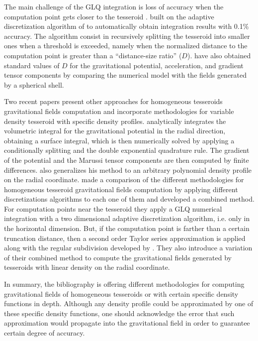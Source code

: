 \documentclass[extra, referee]{gji}
\begin{document}
The main challenge of the GLQ integration is loss of accuracy when the computation point
gets closer to the tesseroid \citep{Ku1977}.
\citet{Uieda2016} built on the adaptive discretization algorithm of \citet{Li2011}
to automatically obtain integration results with 0.1\% accuracy.
The algorithm consist in recursively splitting the tesseroid into smaller ones when a
threshold is exceeded,
namely when the normalized distance to the computation point is greater than a
``distance-size ratio'' ($D$).
\citet{Uieda2016} have also obtained standard values of $D$
for the gravitational potential, acceleration, and gradient tensor components
by comparing the numerical model with the fields generated by a spherical shell.

Two recent papers present other approaches for homogeneous tesseroids gravitational
fields computation and incorporate methodologies for variable density tesseroid with
specific density profiles.
\citet{Fukushima2018} analytically integrates the volumetric integral for the
gravitational potential in the radial direction, obtaining a surface integral, which is
then numerically solved by applying a conditionally splitting and the double exponential
quadrature rule. The gradient of the potential and the Marussi tensor components are
then computed by finite differences. \citet{Fukushima2018} also generalizes his method
to an arbitrary polynomial density profile on the radial coordinate.
\citet{Lin2018} made a comparison of the different methodologies for homogeneous
tesseroid gravitational fields computation by applying different discretizations
algorithms to each one of them and developed a combined method.
For computation points near the tesseroid they apply a GLQ numerical integration with
a two dimensional adaptive discretization algorithm, i.e. only in the horizontal
dimension. But, if the computation point is farther than a certain truncation distance,
then a second order Taylor series approximation is applied along with the regular
subdivision developed by \citet{Grombein2013}.
They also introduce a variation of their combined method to compute the gravitational
fields generated by tesseroids with linear density on the radial coordinate.

In summary, the bibliography is offering different methodologies for computing
gravitational fields of homogeneous tesseroids or with certain specific density
functions in depth.
Although any density profile could be approximated by one of these specific density
functions, one should acknowledge the error that such approximation would propagate into
the gravitational field in order to guarantee certain degree of accuracy.
\end{document}
